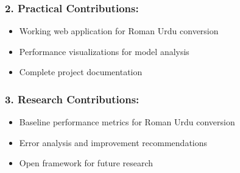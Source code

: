 \documentclass[10pt,twocolumn]{article}
\begin{document}
\subsubsection*{2. Practical Contributions:}
\begin{itemize}[leftmargin=*,noitemsep,topsep=0pt,parsep=0pt,partopsep=0pt]
    \item Working web application for Roman Urdu conversion
    \item Performance visualizations for model analysis
    \item Complete project documentation
\end{itemize}

\subsubsection*{3. Research Contributions:}
\begin{itemize}[leftmargin=*,noitemsep,topsep=0pt,parsep=0pt,partopsep=0pt]
    \item Baseline performance metrics for Roman Urdu conversion
    \item Error analysis and improvement recommendations
    \item Open framework for future research
\end{itemize}
\balance
\end{document}
